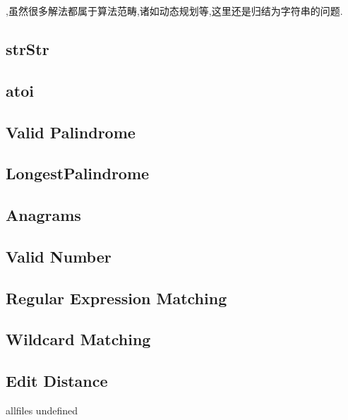 \documentclass{article}
\begin{document}
\begin{CJK}{UTF8}{gbsn}     %

\else
    
,虽然很多解法都属于算法范畴,诸如动态规划等,这里还是归结为字符串的问题.

\subsection{strStr}

\subsection{atoi}

\subsection{Valid Palindrome}

\subsection{LongestPalindrome}

\subsection{Anagrams}

\subsection{Valid Number}

\subsection{Regular Expression Matching}

\subsection{Wildcard Matching}

\subsection{Edit Distance}


\fi

\ifx allfiles undefined
\end{CJK}
\end{document}
